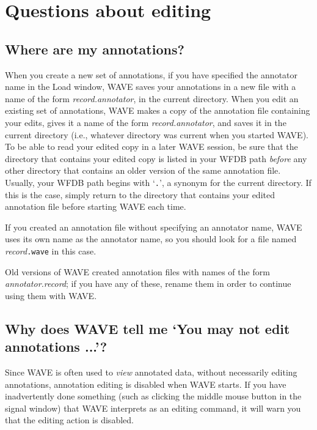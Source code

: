 \documentclass[twoside]{book}
\newcommand{\WAVE}{{\sf WAVE}\xspace}
\begin{document}
\section{Questions about editing}

\subsection{Where are my annotations?}


When you create a new set of annotations, if you have specified the annotator
name in the {\sf Load} window, \WAVE{} saves your annotations in a new file
with a name of the form {\it record.annotator}, in the current directory.  When
you edit an existing set of annotations, \WAVE{} makes a copy of the annotation
file containing your edits, gives it a name of the form {\it record.annotator},
and saves it in the current directory (i.e., whatever directory was current
when you started \WAVE{}).  To be able to read your edited copy in a later
\WAVE{} session, be sure that the directory that contains your edited copy is
listed in your WFDB path \emph{before} any other directory that contains an
older version of the same annotation file.  Usually, your WFDB path begins with
`{\tt .}', a synonym for the current directory.  If this is the case, simply
return to the directory that contains your edited annotation file before
starting \WAVE{} each time.

If you created an annotation file without specifying an annotator
name, \WAVE{} uses its own name as the annotator name, so you should
look for a file named {\it record}{\tt .wave} in this case.

Old versions of \WAVE{} created annotation files with names of the form
{\it annotator.record};  if you have any of these, rename them in order to
continue using them with \WAVE{}.

\subsection{Why does \WAVE{} tell me `You may not edit annotations ...'?}

Since \WAVE{} is often used to \emph{view} annotated data, without
necessarily editing annotations, annotation editing is disabled when
\WAVE{} starts.  If you have inadvertently done something (such as
clicking the middle mouse button in the signal window) that \WAVE{}
interprets as an editing command, it will warn you that the editing
action is disabled.
\end{document}
